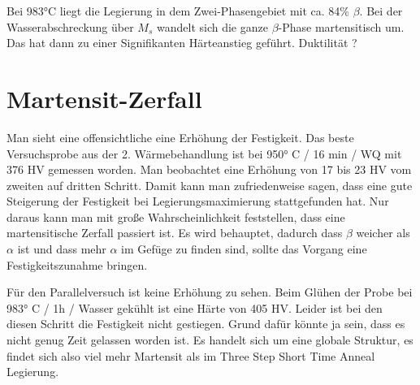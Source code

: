 Bei 983°C  liegt die Legierung in dem  Zwei-Phasengebiet mit ca. 84\% $\beta$. Bei der Wasserabschreckung über $M_s$ wandelt sich die ganze $\beta$-Phase martensitisch um. Das hat dann zu einer Signifikanten Härteanstieg geführt. Duktilität ?


\section{Martensit-Zerfall}

Man sieht eine offensichtliche eine Erhöhung der Festigkeit. Das beste Versuchsprobe aus der 2. Wärmebehandlung ist bei 950° C / 16 min / WQ mit 376 HV gemessen worden. Man beobachtet eine Erhöhung von 17 bis 23 HV vom zweiten auf dritten Schritt. Damit kann man zufriedenweise sagen, dass eine gute Steigerung der Festigkeit bei Legierungsmaximierung stattgefunden hat. Nur daraus kann man mit große Wahrscheinlichkeit feststellen, dass eine martensitische Zerfall passiert ist. Es wird behauptet, dadurch dass $\beta$ weicher als $\alpha$ ist und dass mehr $\alpha$ im Gefüge zu finden sind, sollte das Vorgang eine Festigkeitszunahme bringen. 

Für den Parallelversuch ist keine Erhöhung zu sehen. Beim Glühen der Probe bei 983° C / 1h / Wasser gekühlt ist eine Härte von 405 HV. Leider ist bei den diesen Schritt die Festigkeit nicht gestiegen. Grund dafür könnte ja sein, dass es nicht genug Zeit gelassen worden ist. Es handelt sich um eine globale Struktur, es findet sich also viel mehr Martensit als im Three Step Short Time Anneal Legierung. 
